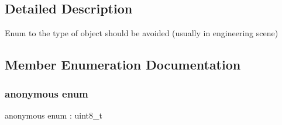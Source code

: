 \subsection{Detailed Description}
Enum to the type of object should be avoided (usually in engineering scene) 

\subsection{Member Enumeration Documentation}
\mbox{\label{structmaf__perception__interface_1_1AvoidObjectTypeEnum_a35554cf9bb22e706e4bd564c872ae2ae}} 
\subsubsection{\texorpdfstring{anonymous enum}{anonymous enum}}
{\footnotesize\ttfamily anonymous enum \+: uint8\+\_\+t}

